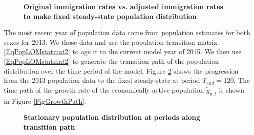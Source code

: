\documentclass[letterpaper,12pt]{article}
\theoremstyle{definition}
\begin{document}
    \begin{figure}[htbp]\centering \captionsetup{width=4.0in}
      \caption{\label{FigImmRateChg}\textbf{Original immigration rates vs. adjusted immigration rates to make fixed steady-state population distribution}}
    \end{figure}

    The most recent year of population data come from \citet{Census:2015} population estimates for both sexes for 2013. We those data and use the population transition matrix \eqref{EqPopLOMstatmat2} to age it to the current model year of 2015. We then use \eqref{EqPopLOMstatmat2} to generate the transition path of the population distribution over the time period of the model. Figure \ref{FigPopDistPath} shows the progression from the 2013 population data to the fixed steady-state at period $T_{end}=120$. The time path of the growth rate of the economically active population $\tilde{g}_{n,t}$ is shown in Figure \ref{FigGrowthPath}.

    \begin{figure}[htbp]\centering \captionsetup{width=4.0in}
      \caption{\label{FigPopDistPath}\textbf{Stationary population distribution at periods along transition path}}
    \end{figure}
\end{document}
